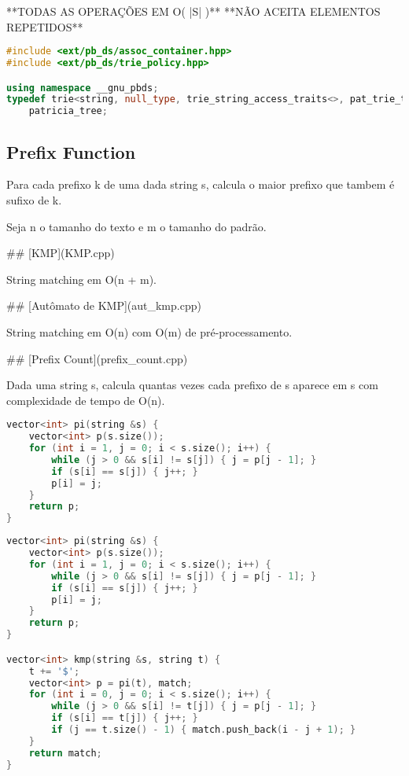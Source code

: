 \documentclass[11pt, a4paper, twoside]{article}
\begin{document}
**TODAS AS OPERAÇÕES EM O( |S| )**  
**NÃO ACEITA ELEMENTOS REPETIDOS**

\begin{lstlisting}[language=C++]
#include <ext/pb_ds/assoc_container.hpp>
#include <ext/pb_ds/trie_policy.hpp>

using namespace __gnu_pbds;
typedef trie<string, null_type, trie_string_access_traits<>, pat_trie_tag, trie_prefix_search_node_update>
    patricia_tree;
\end{lstlisting}

\subsection{Prefix Function}


Para cada prefixo k de uma dada string s, calcula o maior prefixo que tambem é sufixo de k.

Seja n o tamanho do texto e m o tamanho do padrão.

\#\# [KMP](KMP.cpp)

String matching em O(n + m).

\#\# [Autômato de KMP](aut\_kmp.cpp)

String matching em O(n) com O(m) de pré-processamento.

\#\# [Prefix Count](prefix\_count.cpp)

Dada uma string s, calcula quantas vezes cada prefixo de s aparece em s com complexidade de tempo de O(n).

\begin{lstlisting}[language=C++]
vector<int> pi(string &s) {
    vector<int> p(s.size());
    for (int i = 1, j = 0; i < s.size(); i++) {
        while (j > 0 && s[i] != s[j]) { j = p[j - 1]; }
        if (s[i] == s[j]) { j++; }
        p[i] = j;
    }
    return p;
}
\end{lstlisting}

\begin{lstlisting}[language=C++]
vector<int> pi(string &s) {
    vector<int> p(s.size());
    for (int i = 1, j = 0; i < s.size(); i++) {
        while (j > 0 && s[i] != s[j]) { j = p[j - 1]; }
        if (s[i] == s[j]) { j++; }
        p[i] = j;
    }
    return p;
}

vector<int> kmp(string &s, string t) {
    t += '$';
    vector<int> p = pi(t), match;
    for (int i = 0, j = 0; i < s.size(); i++) {
        while (j > 0 && s[i] != t[j]) { j = p[j - 1]; }
        if (s[i] == t[j]) { j++; }
        if (j == t.size() - 1) { match.push_back(i - j + 1); }
    }
    return match;
}
\end{lstlisting}
\end{document}
